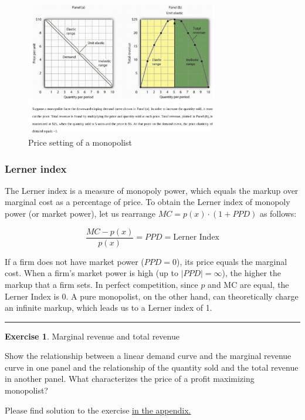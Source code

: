 \documentclass[
  12pt,
  oneside]{book}
\theoremstyle{definition}
\theoremstyle{definition}
\theoremstyle{definition}
\newtheorem{exercise}{Exercise}[chapter]
\theoremstyle{definition}
\theoremstyle{remark}
\begin{document}
\begin{figure}
\centering
\includegraphics[width=0.75\textwidth,height=\textheight]{fig/ppd.png}
\caption[\label{fig:ppd} Price setting of a monopolist]{\label{fig:ppd} Price setting of a monopolist\footnotemark{}}
\end{figure}

\hypertarget{lerner-index}{%
\subsubsection*{Lerner index}\label{lerner-index}}

The Lerner index is a measure of monopoly power, which equals the markup over marginal cost as a percentage of price. To obtain the Lerner index of monopoly power (or market power), let us rearrange \(MC = p(x) \cdot \left(1 + PPD\right)\) as follows:

\[ \frac{MC - p(x)}{p(x)} = PPD = \text{Lerner Index} \]

If a firm does not have market power (\(PPD = 0\)), its price equals the marginal cost. When a firm's market power is high (up to \(|PPD| = \infty\)), the higher the markup that a firm sets. In perfect competition, since \(p\) and MC are equal, the Lerner Index is 0. A pure monopolist, on the other hand, can theoretically charge an infinite markup, which leads us to a Lerner index of 1.

\begin{center}\rule{0.5\linewidth}{0.5pt}\end{center}

\begin{exercise}
\protect\hypertarget{exr:marrevtotrev}{}\label{exr:marrevtotrev}Marginal revenue and total revenue

Show the relationship between a linear demand curve and the marginal revenue curve in one panel and the relationship of the quantity sold and the total revenue in another panel. What characterizes the price of a profit maximizing monopolist?

Please find solution to the exercise \protect\hyperlink{sol:marrevtotrev}{in the appendix.}
\end{exercise}
\end{document}
